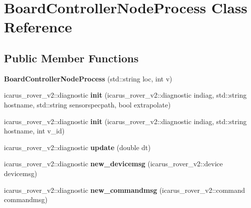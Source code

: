 \hypertarget{classBoardControllerNodeProcess}{}\section{Board\+Controller\+Node\+Process Class Reference}
\label{classBoardControllerNodeProcess}
\subsection*{Public Member Functions}
\begin{DoxyCompactItemize}
\item 
\mbox{\label{classBoardControllerNodeProcess_a814d4e1c7ac760227b2cb1df6fd01efa}} 
{\bfseries Board\+Controller\+Node\+Process} (std\+::string loc, int v)
\item 
\mbox{\label{classBoardControllerNodeProcess_a26dd9a5c6d0d43e27a9a16db6ef482ee}} 
icarus\+\_\+rover\+\_\+v2\+::diagnostic {\bfseries init} (icarus\+\_\+rover\+\_\+v2\+::diagnostic indiag, std\+::string hostname, std\+::string sensorspecpath, bool extrapolate)
\item 
\mbox{\label{classBoardControllerNodeProcess_a03920b023cc8d57c17990ff0fb4365f1}} 
icarus\+\_\+rover\+\_\+v2\+::diagnostic {\bfseries init} (icarus\+\_\+rover\+\_\+v2\+::diagnostic indiag, std\+::string hostname, int v\+\_\+id)
\item 
\mbox{\label{classBoardControllerNodeProcess_a92e2bdb8cbd2d2c3cc7f3a86d21a884c}} 
icarus\+\_\+rover\+\_\+v2\+::diagnostic {\bfseries update} (double dt)
\item 
\mbox{\label{classBoardControllerNodeProcess_a40fcfa5a8fdc89af94d96e4267981c6f}} 
icarus\+\_\+rover\+\_\+v2\+::diagnostic {\bfseries new\+\_\+devicemsg} (icarus\+\_\+rover\+\_\+v2\+::device devicemsg)
\item 
\mbox{\label{classBoardControllerNodeProcess_a568cbeeb34b79af5c61814b7c943c953}} 
icarus\+\_\+rover\+\_\+v2\+::diagnostic {\bfseries new\+\_\+commandmsg} (icarus\+\_\+rover\+\_\+v2\+::command commandmsg)

\end{DoxyCompactItemize}
